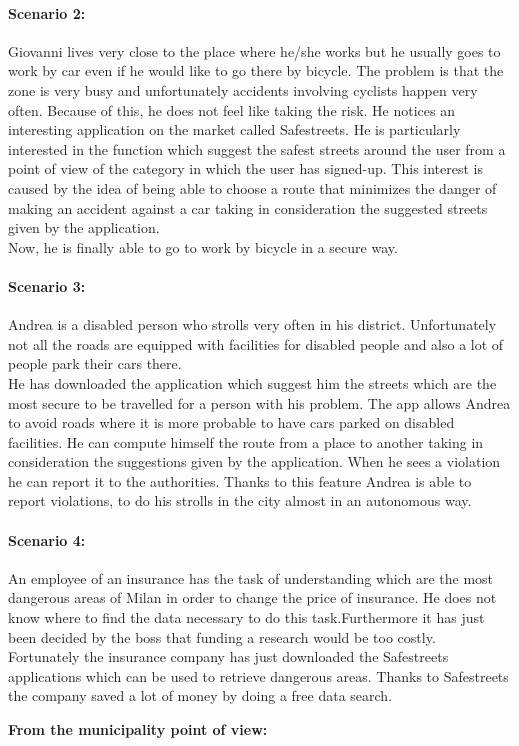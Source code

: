 \documentclass[titlepage]{article}
\begin{document}
\paragraph{Scenario 2:}Giovanni lives very close to the place where he/she works but he usually goes to work by car even if he would like to go there by bicycle. The problem is that the zone is very busy and unfortunately accidents involving cyclists happen very often. Because of this, he does not feel like taking the risk.
He notices an interesting application on the market called Safestreets. He is particularly interested in the function which suggest the safest streets around the user from a point of view of the category in which the user has signed-up. This interest is caused by the idea of ​​being able to choose a route that minimizes the danger of making an accident against a car taking in consideration the suggested streets given by the application.\\
Now, he is finally able to go to work by bicycle in a secure way.
\paragraph{Scenario 3:}Andrea is a disabled person who strolls very often in his district. Unfortunately not all the roads are equipped with facilities for disabled people and also a lot of people park their cars there.\\
He has downloaded the application which suggest him the streets which are the most secure to be travelled for a person with his problem. The app allows Andrea to avoid roads where it is more probable to have cars parked on disabled facilities. He can compute himself the route from a place to another taking in consideration the suggestions given by the application. When he sees a violation he can report it to the authorities. Thanks to this feature Andrea is able to report violations, to do his strolls in the city almost in an autonomous way.
\paragraph{Scenario 4:} An employee of an insurance has the task of understanding which are the most dangerous areas of Milan in order to change the price of insurance. He does not know where to find the data necessary to do this task.Furthermore it has just been decided by the boss that funding a research would be too costly.\\
Fortunately the insurance company has just downloaded the Safestreets applications which can be used to retrieve dangerous areas. Thanks to Safestreets the company saved a lot of money by doing a free data search.\newpage
\begin{center}
	\textbf{From the municipality point of view:}
\end{center}
\end{document}
